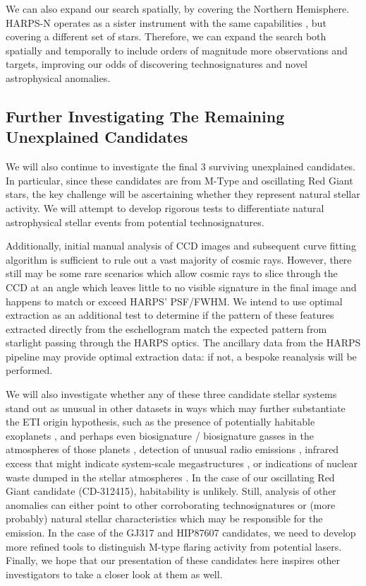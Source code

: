 \documentclass[linenumbers]{aastex631}
\begin{document}
We can also expand our search spatially, by covering the Northern Hemisphere. HARPS-N operates as a sister instrument with the same capabilities \citep{HARPS_N}, but covering a different set of stars. Therefore, we can expand the search both spatially and temporally to include orders of magnitude more observations and targets, improving our odds of discovering technosignatures and novel astrophysical anomalies.

\subsection{Further Investigating The Remaining Unexplained Candidates}

We will also continue to investigate the final 3 surviving unexplained candidates. In particular, since these candidates are from M-Type and oscillating Red Giant stars, the key challenge will be ascertaining whether they represent natural stellar activity. We will attempt to develop rigorous tests to differentiate natural astrophysical stellar events from potential technosignatures. 

Additionally, initial manual analysis of CCD images and subsequent curve fitting algorithm is sufficient to rule out a vast majority of cosmic rays. However, there still may be some rare scenarios which allow cosmic rays to slice through the CCD at an angle which leaves little to no visible signature in the final image and happens to match or exceed HARPS' PSF/FWHM. We intend to use optimal extraction \citep{horne86optimal_extraction} as an additional test to determine if the pattern of these features extracted directly from the eschellogram  match the expected pattern from starlight passing through the HARPS optics. The ancillary data from the HARPS pipeline \citep{HARPS_specs} may provide optimal extraction data: if not, a bespoke reanalysis will be performed. 

We will also investigate whether any of these three candidate stellar systems stand out as unusual in other datasets in ways which may further substantiate the ETI origin hypothesis, such as the presence of potentially habitable exoplanets \citep{exoplanets}, and perhaps even biosignature / biosignature gasses in the atmospheres of those planets \citep{exoplanetbiosignatures,HAQQMISRA2022194}, detection of unusual radio emissions \citep{BACKUS1998651}, infrared excess that might indicate system-scale megastructures \citep{dysonspheres,TILGNER1998607}, or indications of nuclear waste dumped in the stellar atmospheres \citep{WHITMIRE1980149}. In the case of our oscillating Red Giant candidate (CD-312415), habitability is  unlikely. Still, analysis of other anomalies can either point to other corroborating technosignatures or (more probably) natural stellar characteristics which may be responsible for the emission. In the case of the GJ317 and HIP87607 candidates, we need to develop more refined tools to distinguish M-type flaring activity from potential lasers. Finally, we hope that our presentation of these candidates here inspires other investigators to take a closer look at them as well.
\end{document}
